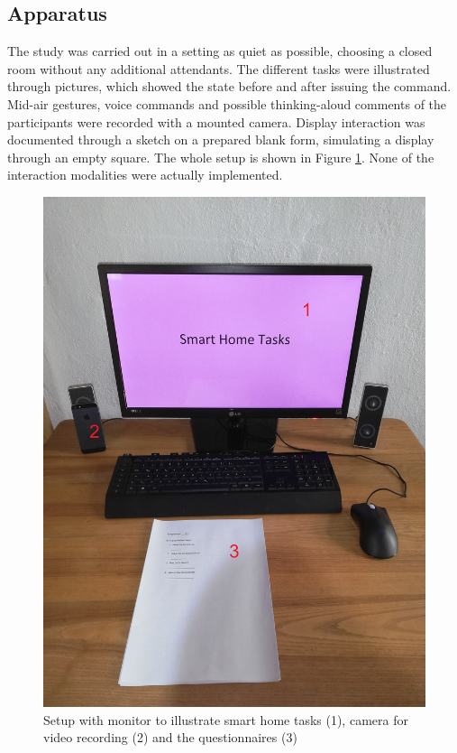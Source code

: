\documentclass[sigchi]{acmart}
\begin{document}
	\subsection{Apparatus}
	The study was carried out in a setting as quiet as possible, choosing a closed room without any additional attendants. The different tasks were illustrated through pictures, which showed the state before and after issuing the command. Mid-air gestures, voice commands and possible thinking-aloud comments of the participants were recorded with a mounted camera. Display interaction was documented through a sketch on a prepared blank form, simulating a display through an empty square. The whole setup is shown in Figure \ref{figure:Setup}. None of the interaction modalities were actually implemented.
	\begin{figure}			
		\centering
		\includegraphics[width=\columnwidth]{SetupZahlen}
		\caption{Setup with monitor to illustrate smart home tasks (1), camera for video recording (2) and the questionnaires (3)}
		\label{figure:Setup}
	\end{figure}
	
\end{document}
